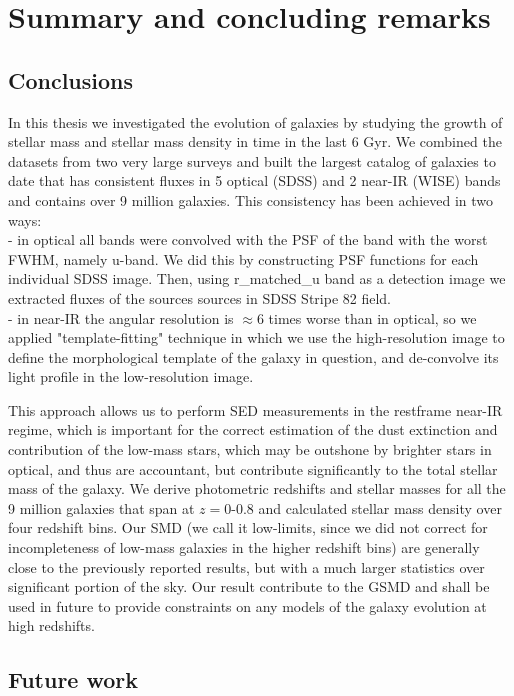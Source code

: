 \chapter{Summary and concluding remarks}\label{CH_summary}

\section{Conclusions}

In this thesis we investigated the evolution of galaxies by studying the growth of stellar mass and stellar mass density in time in the last 6 Gyr. We combined the datasets from two very large surveys and built the largest catalog of galaxies to date that has consistent fluxes in 5 optical (SDSS) and 2 near-IR (WISE) bands and contains over 9 million galaxies. This consistency has been achieved in two ways:\\ 
- in optical all bands were convolved with the PSF of the band with the worst FWHM, namely u-band. We did this by constructing PSF functions for each individual SDSS image. Then, using r\_matched\_u band as a detection image we extracted fluxes of the sources sources in SDSS Stripe 82 field.\\
- in near-IR the angular resolution is $\approx 6$ times worse than in optical, so we applied "template-fitting" technique in which we use the high-resolution image to define the morphological template of the galaxy in question, and de-convolve its light profile in the low-resolution image.

This approach allows us to perform SED measurements in the restframe near-IR regime, which is important for the correct estimation of the dust extinction and contribution of the low-mass stars, which may be outshone by brighter stars in optical, and thus are accountant, but contribute significantly to the total stellar mass of the galaxy. We derive photometric redshifts and stellar masses for all the 9 million galaxies that span at $z=0$-0.8 and calculated stellar mass density over four redshift bins. Our SMD (we call it low-limits, since we did not correct for incompleteness of low-mass galaxies in the higher redshift bins) are generally close to the previously reported results, but with a much larger statistics over significant portion of the sky. Our result contribute to the GSMD and shall be used in future to provide constraints on any models of the galaxy evolution at high redshifts.

\section{Future work}


